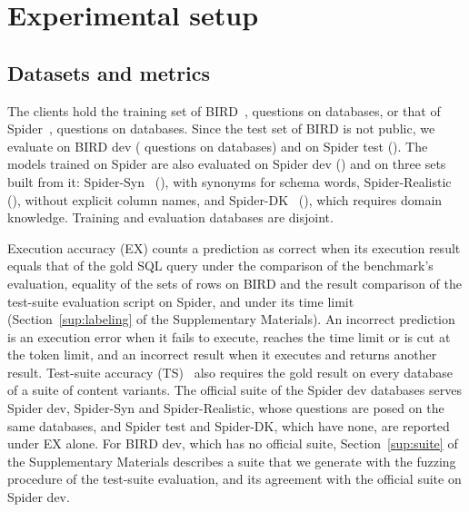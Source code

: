 \section{Experimental setup}\label{sec:setup}

\subsection{Datasets and metrics}\label{sec:datasets}

The clients hold the training set of BIRD~\cite{li2023bird},
 questions on
 databases, or that of
Spider~\cite{yu2018spider}, 
questions on  databases. Since the
test set of BIRD is not public, we evaluate on BIRD dev
( questions on 
databases) and on Spider test (). The models trained on Spider are also
evaluated on Spider dev () and on three sets
built from it: Spider-Syn~\cite{gan2021spidersyn} (),
with synonyms for schema words, Spider-Realistic~\cite{deng2021realistic}
(), without explicit column names, and
Spider-DK~\cite{gan2021spiderdk} (), which requires
domain knowledge. Training and evaluation databases are disjoint.

Execution accuracy (EX) counts a prediction as correct when its
execution result equals that of the gold SQL query under the comparison
of the benchmark's evaluation, equality of the sets of rows on BIRD and
the result comparison of the test-suite evaluation script on Spider, and
under its time limit (Section~\ref{sup:labeling} of the Supplementary
Materials). An incorrect
prediction is an execution error when it fails to execute, reaches the
time limit or is cut at the token limit, and an incorrect result when it
executes and returns another result. Test-suite accuracy
(TS)~\cite{zhong2020testsuite} also requires the gold result on every
database of a suite of content variants. The official suite of the
Spider dev databases serves Spider dev, Spider-Syn and Spider-Realistic,
whose questions are posed on the same databases, and Spider test and
Spider-DK, which have none, are reported under EX alone. For BIRD dev,
which has no official suite, Section~\ref{sup:suite} of the
Supplementary Materials describes a suite that we generate with the
fuzzing procedure of the test-suite evaluation, and its agreement with
the official suite on Spider dev.

